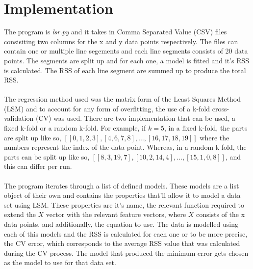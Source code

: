 \documentclass[a4paper,11pt]{article}
\begin{document}
\section{Implementation}
The program is \emph{lsr.py} and it takes in Comma Separated Value (CSV) files
consisiting two columns for the x and y data points respectively. The files can
contain one or multiple line segements and each line segments consists of 20
data points. The segments are split up and for each one, a model is fitted
and it's RSS is calculated. The RSS of each line segment are summed up to
produce the total RSS.
\\ \\
The regression method used was the matrix form of the Least Squares Method (LSM)
and to account for any form of overfitting, the use of a k-fold cross-validation (CV)
was used. There are two implementation that can be used, a fixed k-fold
or a random k-fold. For example, if $k = 5$, in a fixed k-fold, the parts are split up
like so, $[[0, 1, 2, 3], [4, 6, 7, 8], \dots, [16, 17, 18, 19]]$ where the
numbers represent the index of the data point. Whereas, in a random k-fold, the parts
can be split up like so, $[[8, 3, 19, 7], [10, 2, 14, 4], \dots, [15, 1, 0, 8]]$,
and this can differ per run. 
\\ \\
The program iterates through a list of defined models. These models are a list
object of their own and contains the properties that'll allow it to model a
data set using LSM. These properties are it's name, the relevant function required
to extend the $X$ vector with the relevant feature vectors, where $X$ consists of the x
data points, and additionally, the equation to use. The data is modelled using
each of this models and the RSS is calculated for each one or to be more precise,
the CV error, which corresponds to the average RSS value that was calculated
during the CV process.  The model that produced the minimum error gets chosen
as the model to use for that data set.
\end{document}
